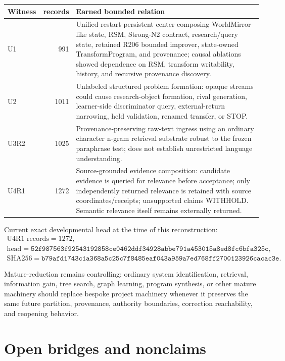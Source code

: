 \documentclass[10pt]{article}
\theoremstyle{venus}
\theoremstyle{definition}
\begin{document}
\begin{center}
\small
\begin{tabularx}{0.97\linewidth}{@{}l r X@{}}
\toprule
Witness & records & Earned bounded relation \\
\midrule
U1 & 991 & Unified restart-persistent center composing WorldMirror-like state,
RSM, Strong-N2 contract, research/query state, retained R206 bounded improver,
state-owned TransformProgram, and provenance; causal ablations showed dependence
on RSM, transform writability, history, and recursive provenance discovery.\\
U2 & 1011 & Unlabeled structured problem formation: opaque streams could cause
research-object formation, rival generation, learner-side discriminator query,
external-return narrowing, held validation, renamed transfer, or STOP.\\
U3R2 & 1025 & Provenance-preserving raw-text ingress using an ordinary character
n-gram retrieval substrate robust to the frozen paraphrase test; does not establish
unrestricted language understanding.\\
U4R1 & 1272 & Source-grounded evidence composition: candidate evidence is queried
for relevance before acceptance; only independently returned relevance is retained
with source coordinates/receipts; unsupported claims WITHHOLD. Semantic relevance
itself remains externally returned.\\
\bottomrule
\end{tabularx}
\end{center}

Current exact developmental head at the time of this reconstruction:
\[
\boxed{
\begin{gathered}
\text{U4R1 records}=1272,\\
\text{head}=\texttt{52f987563f92543192858ce0462ddf34928abbe791a453015a8ed8fc6bfa325c},\\
\text{SHA256}=\texttt{b79afd1743c1a368a5c25c7f8485eaf043a959a7ed768ff2700123926cacac3e}.
\end{gathered}}
\]

Mature-reduction remains controlling: ordinary system identification, retrieval,
information gain, tree search, graph learning, program synthesis, or other mature
machinery should replace bespoke project machinery whenever it preserves the same
future partition, provenance, authority boundaries, correction reachability, and
reopening behavior.

\section{Open bridges and nonclaims}
\end{document}
